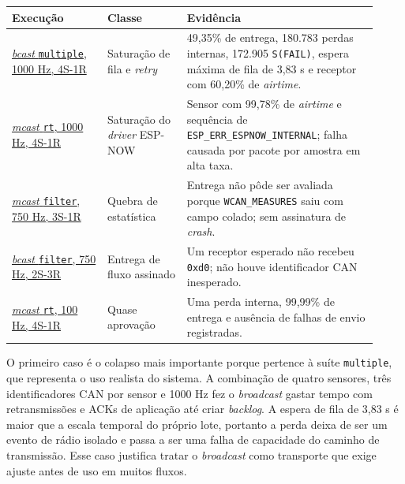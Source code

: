 \begin{center}
\scriptsize
\setlength{\tabcolsep}{3pt}
\renewcommand{\arraystretch}{1.12}
\begin{tabular}{p{0.24\linewidth}|p{0.20\linewidth}|p{0.48\linewidth}}
\hline
Execução & Classe & Evidência \\
\hline
\href{https://github.com/cirillom/WCAN/tree/main/transmitter/testing/results/final/broadcast/multiple/1000Hz/test_4S-1R_rep0}{\emph{bcast} \texttt{multiple}, 1000 Hz, 4S-1R} & Saturação de fila e \emph{retry} & 49,35\% de entrega, 180.783 perdas internas, 172.905 \texttt{S(FAIL)}, espera máxima de fila de 3,83 s e receptor com 60,20\% de \emph{airtime}. \\
\hline
\href{https://github.com/cirillom/WCAN/tree/main/transmitter/testing/results/final/multicast/real_time/1000Hz/test_4S-1R_rep1}{\emph{mcast} \texttt{rt}, 1000 Hz, 4S-1R} & Saturação do \emph{driver} ESP-NOW & Sensor com 99,78\% de \emph{airtime} e sequência de \texttt{ESP\_ERR\_ESPNOW\_INTERNAL}; falha causada por pacote por amostra em alta taxa. \\
\hline
\href{https://github.com/cirillom/WCAN/tree/main/transmitter/testing/results/final/multicast/active_filter/750Hz/test_3S-1R_rep0}{\emph{mcast} \texttt{filter}, 750 Hz, 3S-1R} & Quebra de estatística & Entrega não pôde ser avaliada porque \texttt{WCAN\_MEASURES} saiu com campo colado; sem assinatura de \emph{crash}. \\
\hline
\href{https://github.com/cirillom/WCAN/tree/main/transmitter/testing/results/final/broadcast/active_filter/750Hz/test_2S-3R_rep0}{\emph{bcast} \texttt{filter}, 750 Hz, 2S-3R} & Entrega de fluxo assinado & Um receptor esperado não recebeu \texttt{0xd0}; não houve identificador CAN inesperado. \\
\hline
\href{https://github.com/cirillom/WCAN/tree/main/transmitter/testing/results/final/multicast/real_time/100Hz/test_4S-1R_rep1}{\emph{mcast} \texttt{rt}, 100 Hz, 4S-1R} & Quase aprovação & Uma perda interna, 99,99\% de entrega e ausência de falhas de envio registradas. \\
\hline
\end{tabular}
\label{tab:falhas-representativas-final}
\end{center}

O primeiro caso é o colapso mais importante porque pertence à suíte
\texttt{multiple}, que representa o uso realista do sistema. A combinação de
quatro sensores, três identificadores CAN por sensor e 1000 Hz fez o \emph{broadcast} gastar tempo
com retransmissões e ACKs de aplicação até criar \emph{backlog}. A espera de fila de
3,83 s é maior que a escala temporal do próprio lote, portanto a perda deixa de
ser um evento de rádio isolado e passa a ser uma falha de capacidade do caminho
de transmissão. Esse caso justifica tratar o \emph{broadcast} como transporte que exige
ajuste antes de uso em muitos fluxos.

